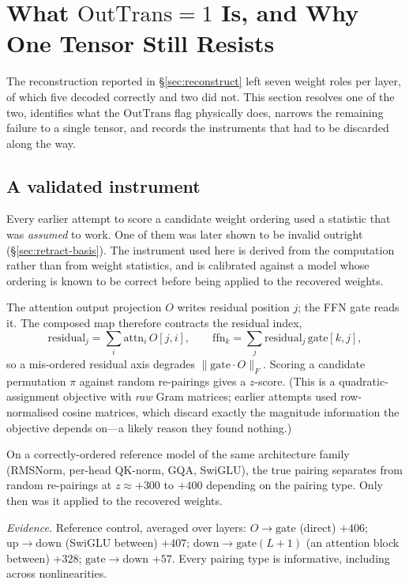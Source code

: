 \section{What \texorpdfstring{$\mathrm{OutTrans}{=}1$}{OutTrans=1} Is, and Why One Tensor Still Resists}\label{sec:outtrans}

The reconstruction reported in \S\ref{sec:reconstruct} left seven weight roles per layer, of which
five decoded correctly and two did not. This section resolves one of the two, identifies what the
$\mathrm{OutTrans}$ flag physically does, narrows the remaining failure to a single tensor, and
records the instruments that had to be discarded along the way.

\subsection{A validated instrument}\label{sec:oracle}

Every earlier attempt to score a candidate weight ordering used a statistic that was \emph{assumed}
to work. One of them was later shown to be invalid outright (\S\ref{sec:retract-basis}). The
instrument used here is derived from the computation rather than from weight statistics, and is
calibrated against a model whose ordering is known to be correct before being applied to the
recovered weights.

The attention output projection $O$ writes residual position $j$; the FFN gate reads it. The composed
map therefore contracts the residual index,
\[
  \mathrm{residual}_j=\textstyle\sum_i \mathrm{attn}_i\,O[j,i],\qquad
  \mathrm{ffn}_k=\textstyle\sum_j \mathrm{residual}_j\,\mathrm{gate}[k,j],
\]
so a mis-ordered residual axis degrades $\lVert \mathrm{gate}\cdot O\rVert_F$. Scoring a candidate
permutation $\pi$ against random re-pairings gives a $z$-score. (This is a quadratic-assignment
objective with \emph{raw} Gram matrices; earlier attempts used row-normalised cosine matrices, which
discard exactly the magnitude information the objective depends on---a likely reason they found
nothing.)

\begin{finding}\label{find:oracle}
On a correctly-ordered reference model of the same architecture family (RMSNorm, per-head QK-norm,
GQA, SwiGLU), the true pairing separates from random re-pairings at $z\approx+300$ to $+400$
depending on the pairing type. Only then was it applied to the recovered weights.
\end{finding}
\noindent\emph{Evidence.} Reference control, averaged over layers: $O\!\to\!\mathrm{gate}$ (direct)
$+406$; $\mathrm{up}\!\to\!\mathrm{down}$ (SwiGLU between) $+407$;
$\mathrm{down}\!\to\!\mathrm{gate}(L{+}1)$ (an attention block between) $+328$;
$\mathrm{gate}\!\to\!\mathrm{down}$ $+57$. Every pairing type is informative, including across
nonlinearities.

